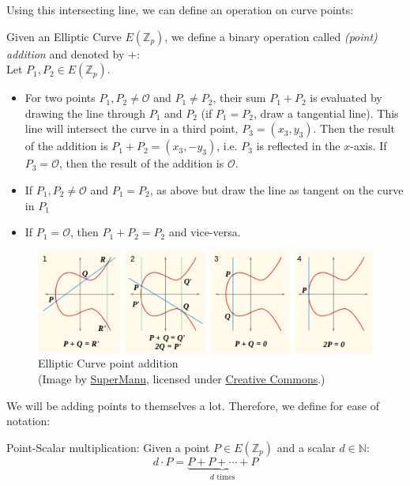 Using this intersecting line, we can define an operation on curve points:
\begin{definition}
    \label{def:point-add}
    Given an Elliptic Curve $E(\mathbb{Z}_p)$, we define a binary operation called \emph{(point) addition} and denoted by $+$:~\cite{katz_introduction_2015}\\
    Let $P_1, P_2 \in E(\mathbb{Z}_p)$.

    \begin{itemize}
        \item For two points $P_1, P_2 \neq \mathcal{O}$ and $P_1 \neq P_2$, their sum $P_1 + P_2$ is evaluated by drawing the line through $P_1$ and $P_2$ (if $P_1 = P_2$, draw a tangential line). 
            This line will intersect the curve in a third point, $P_3 = (x_3, y_3)$.
            Then the result of the addition is $P_1 + P_2 = (x_3, -y_3)$, i.e. $P_3$ is reflected in the $x$-axis.
            If $P_3 = \mathcal{O}$, then the result of the addition is $\mathcal{O}$.
        \item If $P_1, P_2 \neq \mathcal{O}$ and $P_1 = P_2$, as above but draw the line as tangent on the curve in $P_1$
        \item If $P_1 = \mathcal{O}$, then $P_1 + P_2 = P_2$ and vice-versa.
    \end{itemize}
\end{definition} 

\begin{figure}
    \includegraphics[width=\textwidth]{figures/ecc_point_addition.png}
    \caption[Elliptic Curve point addition]{Elliptic Curve point addition\\(Image by \href{https://commons.wikimedia.org/wiki/File:ECClines-2.svg}{SuperManu}, licensed under \href{https://creativecommons.org/licenses/by-sa/3.0/deed.en}{Creative Commons}.)}
    \label{fig:ecc-point-addition}
\end{figure}

We will be adding points to themselves a lot. Therefore, we define for ease of notation:
\begin{definition}
    Point-Scalar multiplication: Given a point $P \in E(\mathbb{Z}_p)$ and a scalar $d \in \mathbb{N}$: 
    \begin{equation}
        d \cdot P = \underbrace{P + P + \cdots + P}_{d \text{ times}}
    \end{equation}
\end{definition}
 
